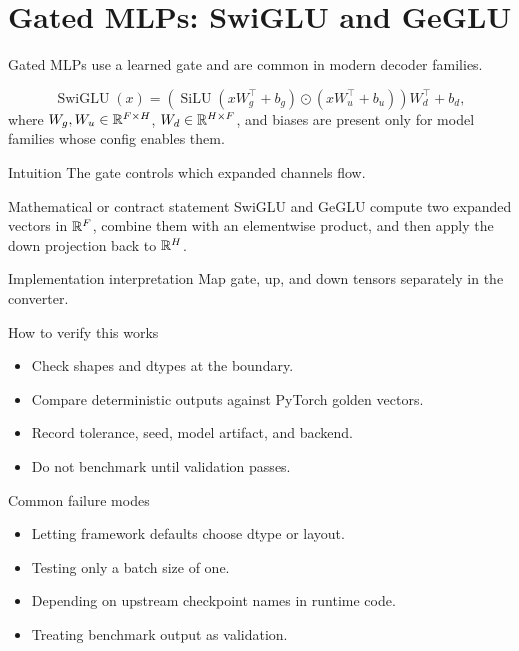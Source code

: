 \chapter{Gated MLPs: SwiGLU and GeGLU}
\label{ch:gated-mlps}
Gated MLPs use a learned gate and are common in modern decoder families. \citep{shazeer2020glu}

\[
\operatorname{SwiGLU}(x)=
\left(\operatorname{SiLU}(xW_g^\top+b_g)\odot (xW_u^\top+b_u)\right)W_d^\top+b_d,
\]
where \(W_g,W_u\in\mathbb{R}^{F\times H}\), \(W_d\in\mathbb{R}^{H\times F}\), and biases are present only for model families whose config enables them.

\begin{intuitionbox}{Intuition}
The gate controls which expanded channels flow.
\end{intuitionbox}

\begin{definitionbox}{Mathematical or contract statement}
SwiGLU and GeGLU compute two expanded vectors in \(\mathbb{R}^F\), combine them with an elementwise product, and then apply the down projection back to \(\mathbb{R}^H\).
\end{definitionbox}

\begin{implementationbox}{Implementation interpretation}
Map gate, up, and down tensors separately in the converter.
\end{implementationbox}

\begin{verificationbox}{How to verify this works}
\begin{itemize}
\item Check shapes and dtypes at the boundary.
\item Compare deterministic outputs against PyTorch golden vectors.
\item Record tolerance, seed, model artifact, and backend.
\item Do not benchmark until validation passes.
\end{itemize}
\end{verificationbox}

\begin{warningbox}{Common failure modes}
\begin{itemize}
\item Letting framework defaults choose dtype or layout.
\item Testing only a batch size of one.
\item Depending on upstream checkpoint names in runtime code.
\item Treating benchmark output as validation.
\end{itemize}
\end{warningbox}

